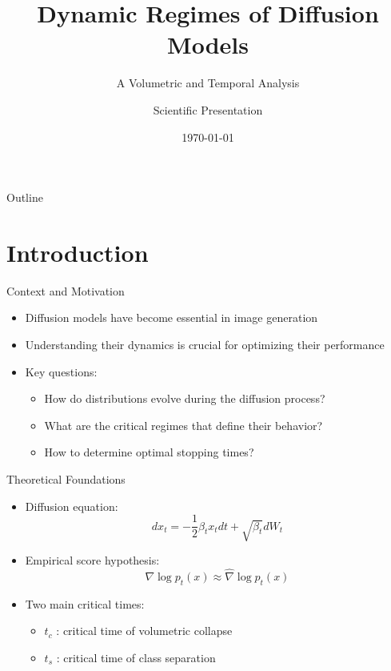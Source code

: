 \documentclass[aspectratio=169]{beamer}
\title{Dynamic Regimes of Diffusion Models}
\subtitle{A Volumetric and Temporal Analysis}
\author{Scientific Presentation}
\institute{Research Laboratory}
\date{\today}
\begin{document}
\begin{frame}
    \titlepage
\end{frame}

\begin{frame}{Outline}
    \tableofcontents
\end{frame}

\section{Introduction}

\begin{frame}{Context and Motivation}
    \begin{itemize}
        \item Diffusion models have become essential in image generation
        \item Understanding their dynamics is crucial for optimizing their performance
        \item Key questions:
        \begin{itemize}
            \item How do distributions evolve during the diffusion process?
            \item What are the critical regimes that define their behavior?
            \item How to determine optimal stopping times?
        \end{itemize}
    \end{itemize}
\end{frame}

\begin{frame}{Theoretical Foundations}
    \begin{itemize}
        \item Diffusion equation:
        \begin{equation}
            dx_t = -\frac{1}{2}\beta_t x_t dt + \sqrt{\beta_t} dW_t
        \end{equation}
        
        \item Empirical score hypothesis:
        \begin{equation}
            \nabla \log p_t(x) \approx \hat{\nabla} \log p_t(x)
        \end{equation}
        
        \item Two main critical times:
        \begin{itemize}
            \item $t_c$ : critical time of volumetric collapse
            \item $t_s$ : critical time of class separation
        \end{itemize}
    \end{itemize}
\end{frame}
\end{document}
